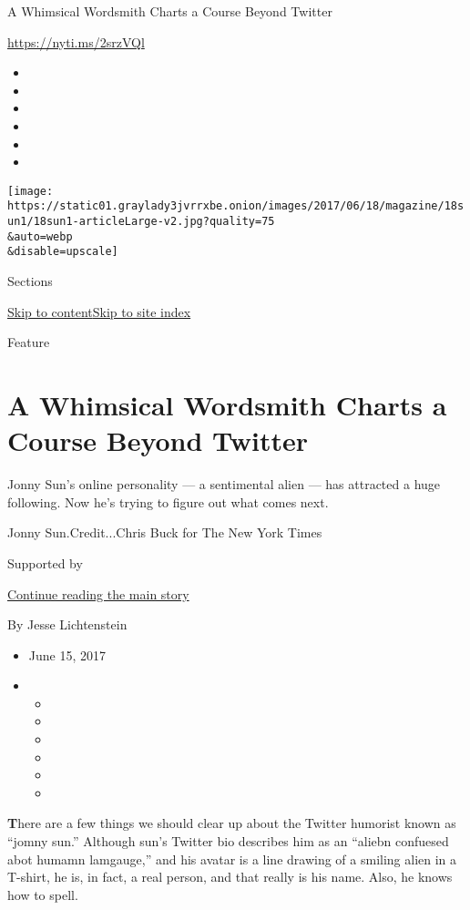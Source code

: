 A Whimsical Wordsmith Charts a Course Beyond Twitter

\url{https://nyti.ms/2srzVQl}

\begin{itemize}
\item
\item
\item
\item
\item
\item
\end{itemize}

\texttt{[image: https://static01.graylady3jvrrxbe.onion/images/2017/06/18/magazine/18sun1/18sun1-articleLarge-v2.jpg?quality=75\\\&auto=webp\\\&disable=upscale]}

Sections

\protect\hyperlink{site-content}{Skip to
content}\protect\hyperlink{site-index}{Skip to site index}

Feature

\hypertarget{a-whimsical-wordsmith-charts-a-course-beyond-twitter}{%
\section{A Whimsical Wordsmith Charts a Course Beyond
Twitter}\label{a-whimsical-wordsmith-charts-a-course-beyond-twitter}}

Jonny Sun's online personality --- a sentimental alien --- has attracted
a huge following. Now he's trying to figure out what comes next.

Jonny Sun.Credit...Chris Buck for The New York Times

Supported by

\protect\hyperlink{after-sponsor}{Continue reading the main story}

By Jesse Lichtenstein

\begin{itemize}
\item
  June 15, 2017
\item
  \begin{itemize}
  \item
  \item
  \item
  \item
  \item
  \item
  \end{itemize}
\end{itemize}

\textbf{T}here are a few things we should clear up about the Twitter
humorist known as ``jomny sun.'' Although sun's Twitter bio describes
him as an ``aliebn confuesed abot humamn lamgauge,'' and his avatar is a
line drawing of a smiling alien in a T-shirt, he is, in fact, a real
person, and that really is his name. Also, he knows how to spell.

